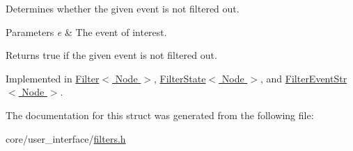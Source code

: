 Determines whether the given event is not filtered out. 


\begin{DoxyParams}{Parameters}
{\em e} & The event of interest. \\
\hline
\end{DoxyParams}
\begin{DoxyReturn}{Returns}
{\ttfamily true} if the given event is not filtered out. 
\end{DoxyReturn}


Implemented in \hyperlink{structFilter_a7c40b004854392a9d5dd1de657ede012}{Filter$<$ Node $>$}, \hyperlink{structFilterState_a67aec5005fc32e68416d53aabe357148}{Filter\+State$<$ Node $>$}, and \hyperlink{structFilterEventStr_a21087cd9792d038bdb14da550ec9a137}{Filter\+Event\+Str$<$ Node $>$}.



The documentation for this struct was generated from the following file\+:\begin{DoxyCompactItemize}
\item 
core/user\+\_\+interface/\hyperlink{filters_8h}{filters.\+h}\end{DoxyCompactItemize}
